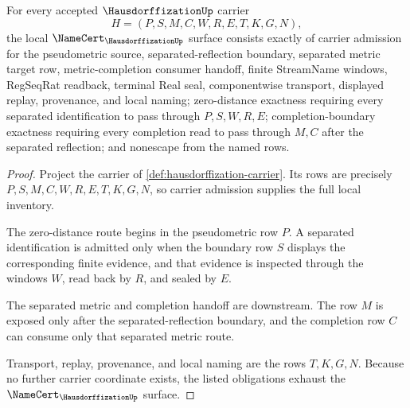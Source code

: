 \begin{theorem}
\label{thm:hausdorffization-namecert-obligations}
For every accepted $\HausdorffizationUp$ carrier
$$
H=(P,S,M,C,W,R,E,T,K,G,N),
$$
the local $\NameCert_{\HausdorffizationUp}$ surface consists exactly of carrier admission for the pseudometric source, separated-reflection boundary, separated metric target row, metric-completion consumer handoff, finite StreamName windows, RegSeqRat readback, terminal Real seal, componentwise transport, displayed replay, provenance, and local naming; zero-distance exactness requiring every separated identification to pass through $P,S,W,R,E$; completion-boundary exactness requiring every completion read to pass through $M,C$ after the separated reflection; and nonescape from the named rows.
\end{theorem}
\begin{proof}
Project the carrier of \autoref{def:hausdorffization-carrier}. Its rows are precisely $P,S,M,C,W,R,E,T,K,G,N$, so carrier admission supplies the full local inventory.

The zero-distance route begins in the pseudometric row $P$. A separated identification is admitted only when the boundary row $S$ displays the corresponding finite evidence, and that evidence is inspected through the windows $W$, read back by $R$, and sealed by $E$.

The separated metric and completion handoff are downstream. The row $M$ is exposed only after the separated-reflection boundary, and the completion row $C$ can consume only that separated metric route.

Transport, replay, provenance, and local naming are the rows $T,K,G,N$. Because no further carrier coordinate exists, the listed obligations exhaust the $\NameCert_{\HausdorffizationUp}$ surface.
\end{proof}


